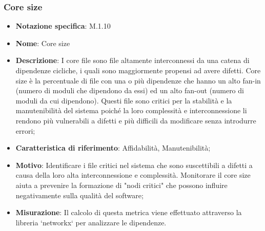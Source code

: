\subsubsection{Core size}
\begin{itemize}
    \item \textbf{Notazione specifica}: M.1.10
    \item \textbf{Nome}: Core size
    \item \textbf{Descrizione}: I core file sono file altamente interconnessi da una catena di dipendenze cicliche, i quali sono maggiormente propensi ad avere difetti. Core size è la percentuale di file con una o più dipendenze che hanno un alto fan-in (numero di moduli che dipendono da essi) ed un alto fan-out (numero di moduli da cui dipendono). Questi file sono critici per la stabilità e la manutenibilità del sistema poiché la loro complessità e interconnessione li rendono più vulnerabili a difetti e più difficili da modificare senza introdurre errori;
    \item \textbf{Caratteristica di riferimento}: Affidabilità, Manutenibilità;
    \item \textbf{Motivo}: Identificare i file critici nel sistema che sono suscettibili a difetti a causa della loro alta interconnessione e complessità. Monitorare il core size aiuta a prevenire la formazione di "nodi critici" che possono influire negativamente sulla qualità del software;
    \item \textbf{Misurazione}: Il calcolo di questa metrica viene effettuato attraverso la libreria `networkx` per analizzare le dipendenze.
    
\end{itemize}
